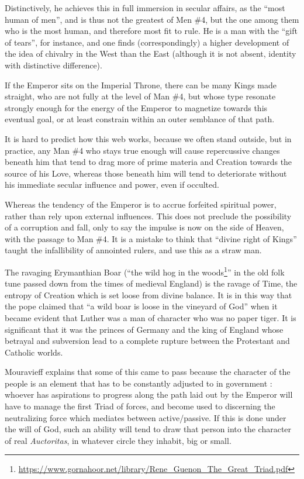 Distinctively, he achieves this in full immersion in secular affairs, as the ``most human of men'', and is thus not the greatest of Men \#4, but the one among them who is the most human, and therefore most fit to rule. He is a man with the ``gift of tears'', for instance, and one finds (correspondingly) a higher development of the idea of chivalry in the West than the East (although it is not absent, identity with distinctive difference).

If the Emperor sits on the Imperial Throne, there can be many Kings made straight, who are not fully at the level of Man \#4, but whose type resonate strongly enough for the energy of the Emperor to magnetize towards this eventual goal, or at least constrain within an outer semblance of that path.

It is hard to predict how this web works, because we often stand outside, but in practice, any Man \#4 who stays true enough will cause repercussive changes beneath him that tend to drag more of prime materia and Creation towards the source of his Love, whereas those beneath him will tend to deteriorate without his immediate secular influence and power, even if occulted.

Whereas the tendency of the Emperor is to accrue forfeited spiritual power, rather than rely upon external influences. This does not preclude the possibility of a corruption and fall, only to say the impulse is now on the side of Heaven, with the passage to Man \#4. It is a mistake to think that ``divine right of Kings'' taught the infallibility of annointed rulers, and use this as a straw man.

The ravaging Erymanthian Boar (``the wild hog in the woods\footnote{\url{https://www.gornahoor.net/library/Rene\_Guenon\_The\_Great\_Triad.pdf}}'' in the old folk tune passed down from the times of medieval England) is the ravage of Time, the entropy of Creation which is set loose from divine balance. It is in this way that the pope claimed that ``a wild boar is loose in the vineyard of God'' when it became evident that Luther was a man of character who was no paper tiger. It is significant that it was the princes of Germany and the king of England whose betrayal and subversion lead to a complete rupture between the Protestant and Catholic worlds.

Mouravieff explains that some of this came to pass because the character of the people is an element that has to be constantly adjusted to in government : whoever has aspirations to progress along the path laid out by the Emperor will have to manage the first Triad of forces, and become used to discerning the neutralizing force which mediates between active/passive. If this is done under the will of God, such an ability will tend to draw that person into the character of real \emph{Auctoritas}, in whatever circle they inhabit, big or small.


